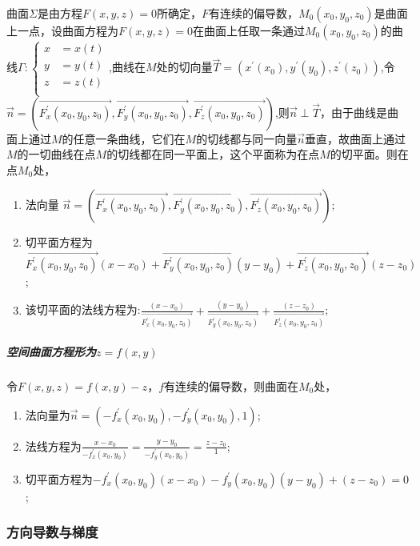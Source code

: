 \documentclass[
]{article}
\begin{document}
曲面\(\Sigma\)是由方程\(F(x,y,z)=0 \)所确定，\(F\)有连续的偏导数，\(M_0(x_0,y_0,z_0)\)是曲面上一点，设曲面方程为\(F(x,y,z)=0\)在曲面上任取一条通过\(M_0(x_0,y_0,z_0)\)的曲线\(\Gamma : \left\{ \begin{aligned} x & = x(t) \\ y & = y(t) \\ z & = z(t) \\ \end{aligned} \right.\),曲线在\(M\)处的切向量\(\vec{T}=(x^{'} (x_0),y^{'} (y_0),z^{'} (z_0))\),令\(\vec{n} = (\vec{F^{'}_x(x_0,y_0,z_0)},\vec{F^{'}_y(x_0,y_0,z_0)},\vec{F^{'}_z(x_0,y_0,z_0)})\),则\(\vec{n} \perp \vec{T}\)，由于曲线是曲面上通过\(M\)的任意一条曲线，它们在\(M\)的切线都与同一向量\(\vec{n}\)垂直，故曲面上通过\(M\)的一切曲线在点\(M\)的切线都在同一平面上，这个平面称为在点\(M\)的切平面。则在点\(M_0\)处，

\begin{enumerate}
\def\labelenumi{\arabic{enumi}.}
\item
  法向量
  \(\vec{n} = (\vec{F^{'}_x(x_0,y_0,z_0)},\vec{F^{'}_y(x_0,y_0,z_0)},\vec{F^{'}_z(x_0,y_0,z_0)})\);
\item
  切平面方程为\(\vec{F^{'}_x(x_0,y_0,z_0)}(x-x_0)+\vec{F^{'}_y(x_0,y_0,z_0)}(y-y_0)+\vec{F^{'}_z(x_0,y_0,z_0)}(z-z_0)\);
\item
  该切平面的法线方程为:\(\frac{(x-x_0)}{\vec{F^{'}_x(x_0,y_0,z_0)}}+\frac{(y-y_0)}{\vec{F^{'}_y(x_0,y_0,z_0)}}+\frac{(z-z_0)}{\vec{F^{'}_z(x_0,y_0,z_0)}}\);
\end{enumerate}

\hypertarget{ux7a7aux95f4ux66f2ux9762ux65b9ux7a0bux5f62ux4e3auxazfxy}{%
\subparagraph{\texorpdfstring{空间曲面方程形为\(z=f(x,y)\)}{空间曲面方程形为z=f(x,y)}}\label{ux7a7aux95f4ux66f2ux9762ux65b9ux7a0bux5f62ux4e3auxazfxy}}

令\(F(x,y,z)=f(x,y)-z\)，\(f\)有连续的偏导数，则曲面在\(M_0\)处，

\begin{enumerate}
\def\labelenumi{\arabic{enumi}.}
\item
  法向量为\(\vec{n}=(-f^{'}_x (x_0,y_0),-f^{'}_y (x_0,y_0),1)\);
\item
  法线方程为\(\frac{x-x_0}{-f^{'}_x (x_0,y_0)}=\frac{y-y_0}{-f^{'}_y (x_0,y_0)}=\frac{z-z_0}{1}\);
\item
  切平面方程为\(-f^{'}_x (x_0,y_0)(x-x_0)-f^{'}_y (x_0,y_0)(y-y_0)+(z-z_0)=0\);
\end{enumerate}

\hypertarget{ux65b9ux5411ux5bfcux6570ux4e0eux68afux5ea6}{%
\subsubsection{方向导数与梯度}\label{ux65b9ux5411ux5bfcux6570ux4e0eux68afux5ea6}}
\end{document}
